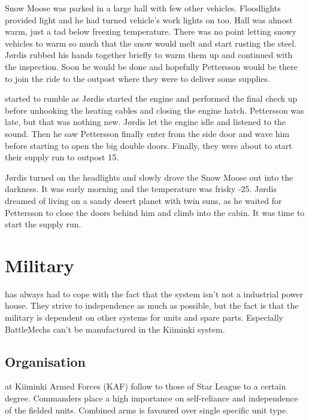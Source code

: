 \documentclass{tufte-book}
\begin{document}
Snow Moose was parked in a large hall with few other vehicles.
Floodlights provided light and he had turned vehicle's work lights on
too. Hall was almost warm, just a tad below freezing temperature.
There was no point letting snowy vehicles to warm so much that the
snow would melt and start rusting the steel. J\o rdis rubbed his hands
together briefly to warm them up and continued with the inspection.
Soon he would be done and hopefully Pettersson would be there to
join the ride to the outpost where they were to deliver some
supplies.

 started to rumble as J\o rdis started the
engine and performed the final check up before unhooking the heating
cables and closing the engine hatch. Pettersson was late, but that was
nothing new. J\o rdis let the engine idle and listened to the sound.
Then he saw Pettersson finally enter from the side door and wave him
before starting to open the big double doors. Finally, they were about
to start their supply run to outpost 15.

J\o rdis turned on the headlights and slowly drove the Snow Moose out
into the darkness. It was early morning and the temperature was frisky
-25\celsius. J\o rdis dreamed of living on a sandy desert planet with
twin suns, as he waited for Pettersson to close the doors behind him 
and climb into the cabin. It was time to start the supply run.



\chapter{Military}
\label{ch:military}

 has always had to cope with the fact
that the system isn't not a industrial power house. They strive to
independence as much as possible, but the fact is that the military
is dependent on other systems for units and spare parts. Especially
BattleMechs can't be manufactured in the Kiiminki system.

\section{Organisation}
\label{sc:organisation}

 at Kiiminki Armed Forces (KAF) follow
to those of Star League to a certain degree. Commanders place a high
importance on self-reliance and independence of the fielded units.
Combined arms is favoured over single specific unit type.
\end{document}
